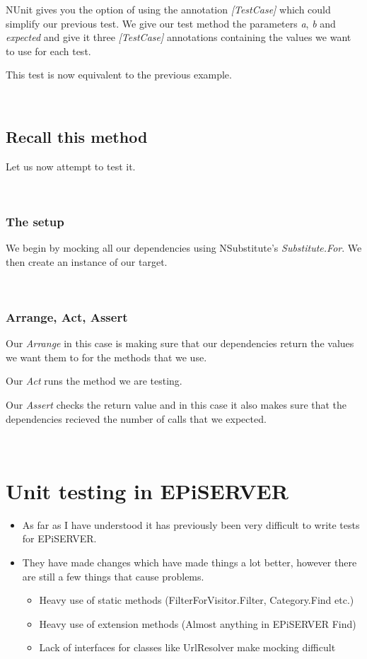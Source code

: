 \documentclass[12pt]{article}
\begin{document}
NUnit gives you the option of using the annotation \emph{[TestCase]} which could simplify our previous test. We give our test method the parameters \emph{a}, \emph{b} and \emph{expected} and give it three \emph{[TestCase]} annotations containing the values we want to use for each test.

This test is now equivalent to the previous example.

~\\
\subsection{Recall this method}


Let us now attempt to test it.

~\\
\subsubsection{The setup}

We begin by mocking all our dependencies using NSubstitute's \emph{Substitute.For}. We then create an instance of our target.

~\\
\subsubsection{Arrange, Act, Assert}


Our \emph{Arrange} in this case is making sure that our dependencies return the values we want them to for the methods that we use.

Our \emph{Act} runs the method we are testing.

Our \emph{Assert} checks the return value and in this case it also makes sure that the dependencies recieved the number of calls that we expected.

~\\
\section{Unit testing in EPiSERVER}
\begin{itemize}
	\item As far as I have understood it has previously been very difficult to write tests for EPiSERVER.
	\item They have made changes which have made things a lot better, however there are still a few things that cause problems.
		\begin{itemize}
			\item Heavy use of static methods (FilterForVisitor.Filter, Category.Find etc.)
			\item Heavy use of extension methods (Almost anything in EPiSERVER Find)
			\item Lack of interfaces for classes like UrlResolver make mocking difficult
		\end{itemize}
\end{itemize}
\end{document}

